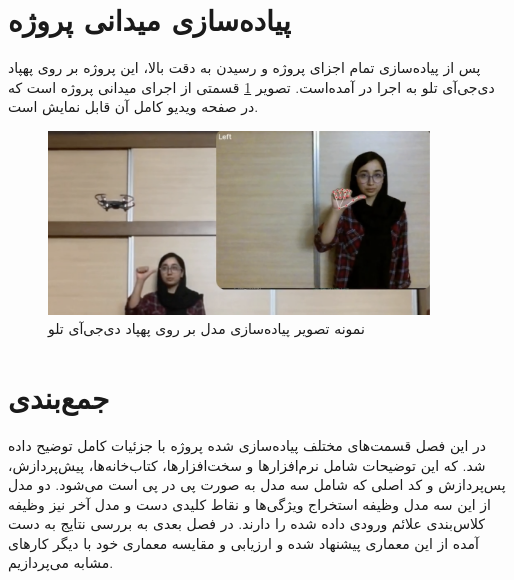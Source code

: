 \section{پیاده‌سازی میدانی پروژه}
پس از پیاده‌سازی تمام اجزای پروژه و رسیدن به دقت بالا، این پروژه بر روی پهپاد دی‌جی‌آی تلو به اجرا در آمده‌است. 
تصویر \ref{phisical} قسمتی از اجرای میدانی پروژه است که در صفحه \cite{GitHubsa96:online} ویدیو کامل آن قابل نمایش است.

\begin{figure}[h]
    \centering
    \includegraphics[width=0.9\textwidth]{drone_control.png}
    \caption{نمونه تصویر پیاده‌سازی مدل بر روی پهپاد دی‌جی‌آی تلو}
    \label{phisical}
\end{figure}

\section{جمع‌بندی}
در این فصل قسمت‌های مختلف پیاده‌سازی شده پروژه با جزئیات کامل توضیح داده شد. که این توضیحات شامل نرم‌افزار‌ها و سخت‌افزارها، کتاب‌خانه‌ها، پیش‌پردازش، پس‌پردازش و کد اصلی که شامل سه مدل به صورت پی در پی است می‌شود.
دو مدل از این سه مدل وظیفه استخراج ویژگی‌ها و نقاط کلیدی دست و مدل آخر نیز وظیفه کلاس‌بندی علائم ورودی داده شده را دارند.
در فصل بعدی به بررسی نتایج به دست آمده از این معماری پیشنهاد شده و ارزیابی و مقایسه معماری خود با دیگر کار‌های مشابه می‌پردازیم.


